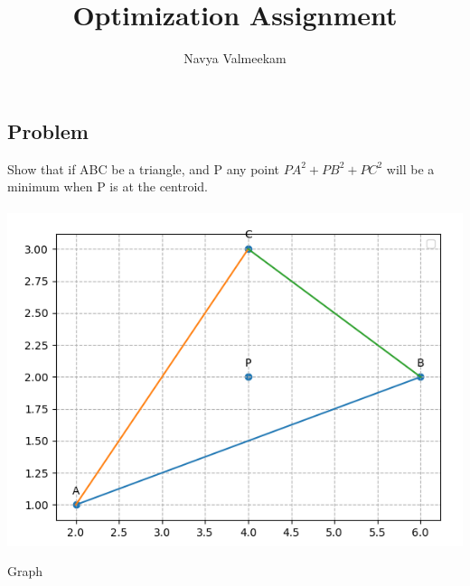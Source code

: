 \documentclass[journal,12pt,twocolumn]{IEEEtran}
\title{Optimization Assignment}
\author{Navya Valmeekam}
\begin{document}
\providecommand{\norm}[1]{\left\lVert#1\right\rVert}
\maketitle
\begin{tableofcontents}
\section{Problem}
\noindent Show that if ABC be a triangle, and P any point $PA^{2}+PB^{2}+PC^{2}$ will be a minimum when P is at the centroid. 
\\
\\
\includegraphics[scale=0.44]{opt_adv.png} 
\begin{center}
Graph
\end{center}
\vspace{0.2cm}

\end{tableofcontents}
\end{document}
